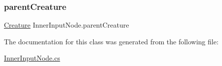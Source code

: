 \subsubsection{\texorpdfstring{parent\+Creature}{parentCreature}}
{\footnotesize\ttfamily \mbox{\hyperlink{class_creature}{Creature}} Inner\+Input\+Node.\+parent\+Creature}



The documentation for this class was generated from the following file\+:\begin{DoxyCompactItemize}
\item 
\mbox{\hyperlink{_inner_input_node_8cs}{Inner\+Input\+Node.\+cs}}\end{DoxyCompactItemize}
